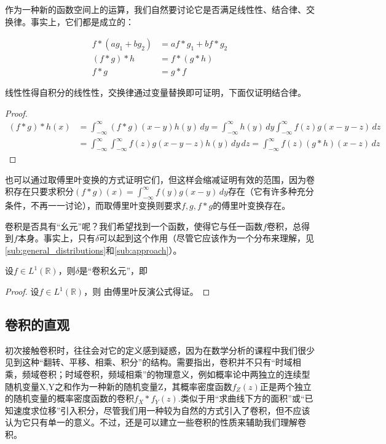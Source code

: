 作为一种新的函数空间上的运算，我们自然要讨论它是否满足线性性、结合律、交换律。事实上，它们都是成立的：
\begin{proposition}
    \begin{align*}
    f*(ag_1+bg_2) & =af*g_1+bf*g_2 \\
    (f*g)*h       & =f*(g*h)       \\
    f*g           & =g*f
\end{align*}
\end{proposition}
线性性得自积分的线性性，交换律通过变量替换即可证明，下面仅证明结合律。
\begin{proof}
\begin{align*}
    (f*g)*h(x) & =\int_{-\infty}^{\infty}(f*g)(x-y)h(y)\,dy=\int_{-\infty}^{\infty}h(y)\,dy\int_{-\infty}^{\infty}f(z)g(x-y-z)\,dz \\
               & =\int_{-\infty}^{\infty}\int_{-\infty}^{\infty}f(z)g(x-y-z)h(y)\,dy\,dz=\int_{-\infty}^{\infty}f(z)(g*h)(x-z)\,dz
\end{align*}
\end{proof}

也可以通过取傅里叶变换的方式证明它们，但这样会缩减证明有效的范围，因为卷积存在只要求积分$(f*g)(x)=\int_{-\infty}^{\infty}f(y)g(x-y)\,dy$存在（它有许多种充分条件，不再一一讨论），而取傅里叶变换则要求$f,g,f*g$的傅里叶变换存在。

卷积是否具有“幺元”呢？我们希望找到一个函数，使得它与任一函数$f$卷积，总得到$f$本身。事实上，只有$\delta$可以起到这个作用（尽管它应该作为一个分布来理解，见\ref{sub:general_distributions}和\ref{sub:approach}）。
\begin{proposition}[卷积幺元]
    设$f\in L^1(\mathbb{R})$，则$\delta$是“卷积幺元”，即
\end{proposition}
\begin{proof}
设$f\in L^1(\mathbb{R})$，则
由傅里叶反演公式得证。
\end{proof}

\subsection{卷积的直观}\label{sub:intuition_of_convolution}
初次接触卷积时，往往会对它的定义感到疑惑，因为在数学分析的课程中我们很少见到这种“翻转、平移、相乘、积分”的结构。需要指出，卷积并不只有“时域相乘，频域卷积；时域卷积，频域相乘”的物理意义，例如概率论中两独立的连续型随机变量X,Y之和作为一种新的随机变量Z，其概率密度函数$f_Z(z)$正是两个独立的随机变量的概率密度函数的卷积$f_X*f_Y(z)$.类似于用“求曲线下方的面积”或“已知速度求位移”引入积分，尽管我们用一种较为自然的方式引入了卷积，但不应该认为它只有单一的意义。不过，还是可以建立一些卷积的性质来辅助我们理解卷积。

